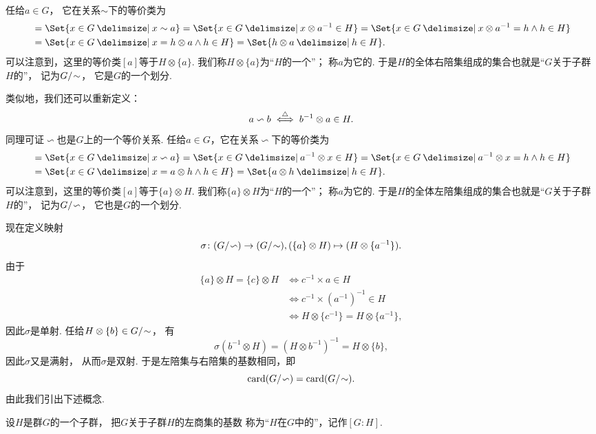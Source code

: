 任给\(a \in G\)，
它在关系\(\sim\)下的等价类为\begin{align*}
	[a] &= \Set{ x \in G \given x \sim a }
	= \Set{ x \in G \given x \otimes a^{-1} \in H }
	= \Set{ x \in G \given x \otimes a^{-1} = h \land h \in H } \\
	&= \Set{ x \in G \given x = h \otimes a \land h \in H }
	= \Set{ h \otimes a \given h \in H }.
\end{align*}
可以注意到，这里的等价类\([a]\)等于\(H \otimes \{a\}\).
我们称\(H \otimes \{a\}\)为“\(H\)的一个”；
称\(a\)为它的.
于是\(H\)的全体右陪集组成的集合也就是“\(G\)关于子群\(H\)的”，
记为\(G/\kern-2pt\sim\)，
它是\(G\)的一个划分.

类似地，我们还可以重新定义：\[
	a \backsim b
	\overset{\triangle}{\iff}
	b^{-1} \otimes a \in H.
\]
同理可证\(\backsim\)也是\(G\)上的一个等价关系.
任给\(a \in G\)，它在关系\(\backsim\)下的等价类为\begin{align*}
	[a] &= \Set{ x \in G \given x \backsim a }
	= \Set{ x \in G \given a^{-1} \otimes x \in H }
	= \Set{ x \in G \given a^{-1} \otimes x = h \land h \in H } \\
	&= \Set{ x \in G \given x = a \otimes h \land h \in H }
	= \Set{ a \otimes h \given h \in H }.
\end{align*}
可以注意到，这里的等价类\([a]\)等于\(\{a\} \otimes H\).
我们称\(\{a\} \otimes H\)为“\(H\)的一个”；
称\(a\)为它的.
于是\(H\)的全体左陪集组成的集合也就是“\(G\)关于子群\(H\)的”，
记为\(G/\kern-2pt\backsim\)，
它也是\(G\)的一个划分.

现在定义映射\[
	\sigma\colon (G/\kern-2pt\backsim) \to (G/\kern-2pt\sim),
	(\{a\} \otimes H) \mapsto (H \otimes \{a^{-1}\}).
\]
由于\begin{align*}
	\{a\} \otimes H = \{c\} \otimes H
	&\iff
	c^{-1} \times a \in H \\
	&\iff
	c^{-1} \times (a^{-1})^{-1} \in H \\
	&\iff
	H \otimes \{c^{-1}\} = H \otimes \{a^{-1}\},
\end{align*}
因此\(\sigma\)是单射.
任给\(H \otimes \{b\} \in G/\kern-2pt\sim\)，
有\[
	\sigma(b^{-1} \otimes H)
	= (H \otimes b^{-1})^{-1}
	= H \otimes \{b\},
\]
因此\(\sigma\)又是满射，
从而\(\sigma\)是双射.
于是左陪集与右陪集的基数相同，即\[
	\operatorname{card}(G/\kern-2pt\backsim) = \operatorname{card}(G/\kern-2pt\sim).
\]
由此我们引出下述概念.
\begin{definition}
设\(H\)是群\(G\)的一个子群，
把\(G\)关于子群\(H\)的左商集的基数
称为“\(H\)在\(G\)中的”，记作\([G:H]\).
\end{definition}

